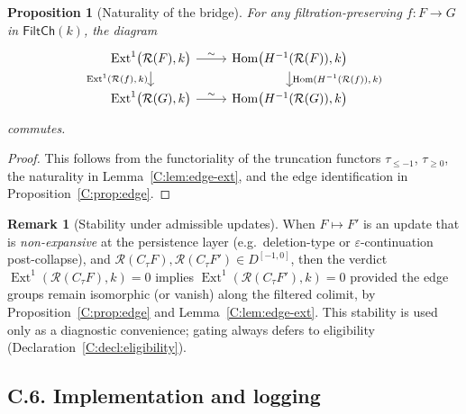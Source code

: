 \documentclass[11pt]{article}
\DeclareMathOperator{\Ext}{Ext}
\DeclareMathOperator{\Hom}{Hom}
\numberwithin{equation}{section}
\newtheorem{proposition}[theorem]{Proposition}
\theoremstyle{definition}
\newtheorem{remark}[theorem]{Remark}
\providecommand{\n}{\unskip\space}
\begin{document}
\begin{proposition}[Naturality of the bridge]
For any filtration-preserving \(f:F\to G\) in \(\mathsf{FiltCh}(k)\), the diagram
\[
\begin{tikzcd}[row sep=1.2em, column sep=2.4em]\n\Ext^1\!\big(\mathcal{R}(F),k\big)\n  \arrow[r, "\sim"]\n  \arrow[d, "{\Ext^1(\mathcal{R}(f),\,k)}"'] &\n\Hom\!\big(H^{-1}(\mathcal{R}(F)),k\big)\n  \arrow[d, "{\Hom(H^{-1}(\mathcal{R}(f)),\,k)}"]\\\n\Ext^1\!\big(\mathcal{R}(G),k\big)\n  \arrow[r, "\sim"] &\n\Hom\!\big(H^{-1}(\mathcal{R}(G)),k\big)\n\end{tikzcd}
\]
commutes.
\end{proposition}

\begin{proof}
This follows from the functoriality of the truncation functors \(\tau_{\le -1}\), \(\tau_{\ge 0}\), the naturality in Lemma~\ref{C:lem:edge-ext}, and the edge identification in Proposition~\ref{C:prop:edge}.
\end{proof}

\begin{remark}[Stability under admissible updates]
When \(F\mapsto F'\) is an update that is \emph{non-expansive} at the persistence layer (e.g.\ deletion-type or \(\varepsilon\)-continuation post-collapse), and \(\mathcal{R}(C_\tau F),\mathcal{R}(C_\tau F')\in D^{[-1,0]}\), then the verdict \(\Ext^1(\mathcal{R}(C_\tau F),k)=0\) implies \(\Ext^1(\mathcal{R}(C_\tau F'),k)=0\) provided the edge groups remain isomorphic (or vanish) along the filtered colimit, by Proposition~\ref{C:prop:edge} and Lemma~\ref{C:lem:edge-ext}.
This stability is used only as a diagnostic convenience; gating always defers to eligibility (Declaration~\ref{C:decl:eligibility}).
\end{remark}

\subsection*{C.6. Implementation and logging}
\end{document}
